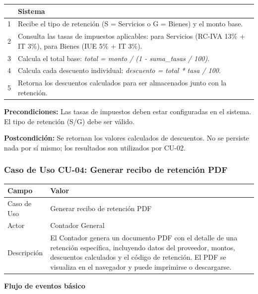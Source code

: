 \documentclass[stu]{apa7}
\begin{document}
\begin{tabularx}{\textwidth}{|c|X|}
\hline
& \textbf{Sistema} \\
\hline
1 & Recibe el tipo de retención (S = Servicios o G = Bienes) y el monto base. \\
\hline
2 & Consulta las tasas de impuestos aplicables: para Servicios (RC-IVA 13\% + IT 3\%), para Bienes (IUE 5\% + IT 3\%). \\
\hline
3 & Calcula el total base: \textit{total = monto / (1 - suma\_tasas / 100)}. \\
\hline
4 & Calcula cada descuento individual: \textit{descuento = total * tasa / 100}. \\
\hline
5 & Retorna los descuentos calculados para ser almacenados junto con la retención. \\
\hline
\end{tabularx}

\vspace{0.3cm}

\textbf{Precondiciones:} Las tasas de impuestos deben estar configuradas en el sistema. El tipo de retención (S/G) debe ser válido.

\textbf{Postcondición:} Se retornan los valores calculados de descuentos. No se persiste nada por sí mismo; los resultados son utilizados por CU-02.

\newpage

\subsubsection{Caso de Uso CU-04: Generar recibo de retención PDF}

\begin{tabularx}{\textwidth}{|l|X|}
\hline
\rowcolor[gray]{0.9}
\textbf{Campo} & \textbf{Valor} \\
\hline
Caso de Uso & Generar recibo de retención PDF \\
\hline
Actor & Contador General \\
\hline
Descripción & El Contador genera un documento PDF con el detalle de una retención específica, incluyendo datos del proveedor, montos, descuentos calculados y el código de retención. El PDF se visualiza en el navegador y puede imprimirse o descargarse. \\
\hline
\end{tabularx}

\vspace{0.3cm}

\textbf{Flujo de eventos básico}
\end{document}

